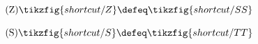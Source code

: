 \begin{figure}[H]
{{\begin{minipage}{0.975\textwidth}
            \begin{minipage}{0.25\textwidth}
                \centering
                \begin{equation}
                    \tag{Z}\label{cnot-Z}
                    \tikzfig{shortcut/Z} \defeq \tikzfig{shortcut/SS}
                \end{equation}
            \end{minipage}
            \begin{minipage}{0.25\textwidth}
                \centering
                \begin{equation}
                    \tag{S}\label{cnot-S}
                    \tikzfig{shortcut/S} \defeq \tikzfig{shortcut/TT}
                \end{equation}
            \end{minipage}\vspace{-0.6em}


\end{minipage}}}
\end{figure}
